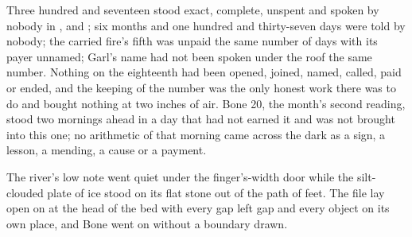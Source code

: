 Three hundred and seventeen stood exact, complete, unspent and spoken by nobody in ,  and ; six months and one hundred and thirty-seven days were told by nobody; the carried fire's fifth was unpaid the same number of days with its payer unnamed; Garl's name had not been spoken under the roof the same number. Nothing on the eighteenth had been opened, joined, named, called, paid or ended, and the keeping of the number was the only honest work there was to do and bought nothing at two inches of air. Bone 20, the month's second reading, stood two mornings ahead in a day that had not earned it and was not brought into this one; no arithmetic of that morning came across the dark as a sign, a lesson, a mending, a cause or a payment.

The river's low note went quiet under the finger's-width door while the silt-clouded plate of ice stood on its flat stone out of the path of feet. The file lay open on  at the head of the bed with every gap left gap and every object on its own place, and Bone went on without a boundary drawn.
